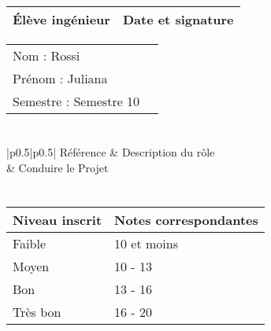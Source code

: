 \documentclass[11pt]{article}
\begin{document}

\begin{center}
\begin{table}[!hp]

	\begin{tabularx}{\linewidth}{|X|X|}
	\hline
	\rowcolor{gray!40} Élève ingénieur & Date et signature \\
	\hline
	\end{tabularx}
	\begin{tabularx}{\linewidth}{|X|X|}
	Nom : Rossi &  \\ 
	Prénom : Juliana & \\
	Semestre : Semestre 10 & \\
	\hline
	\end{tabularx}
\end{table}
\end{center}

\section*{\large\FR}

\centering
	\begin{longtable}{|p{0.5\textwidth}|p{0.5\textwidth}|}
	\hline
	 Référence \WBSCourt & Description du rôle \\
	 & Conduire le Projet \\
	 \hline
	\end{longtable}


\section*{\large\FC}


\begin{table}[!hp]
\centering
	\begin{tabularx}{\linewidth}{|X|X|}
	\hline
	\rowcolor{gray!40} Niveau inscrit & Notes correspondantes \\
	\hline
	 Faible & 10 et moins \\
	 \hline
	 Moyen & 10 - 13 \\
	 \hline
	 Bon & 13 - 16 \\
	 \hline
	 Très bon & 16 - 20 \\
	 \hline
	\end{tabularx}
\end{table}
\end{document}
